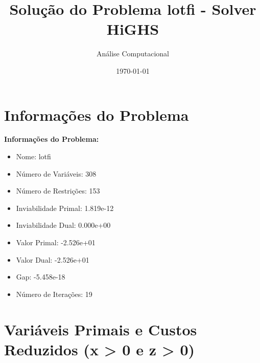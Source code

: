 \documentclass[12pt]{article}
\title{Solução do Problema lotfi - Solver HiGHS}
\author{Análise Computacional}
\date{\today}
\begin{document}
\maketitle

\section{Informações do Problema}

\textbf{Informações do Problema:}
\begin{itemize}
\item Nome: lotfi
\item Número de Variáveis: 308
\item Número de Restrições: 153
\item Inviabilidade Primal: 1.819e-12
\item Inviabilidade Dual: 0.000e+00
\item Valor Primal: -2.526e+01
\item Valor Dual: -2.526e+01
\item Gap: -5.458e-18
\item Número de Iterações: 19
\end{itemize}


\section{Variáveis Primais e Custos Reduzidos (x > 0 e z > 0)}
\end{document}
